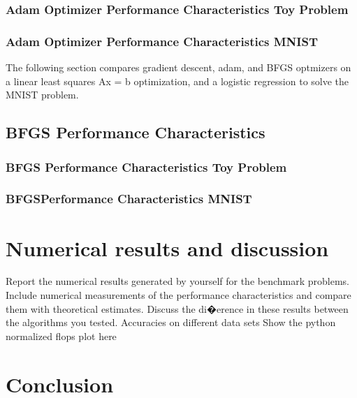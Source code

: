 \documentclass[10pt,twocolumn]{article}
\begin{document}
\subsubsection{Adam Optimizer Performance Characteristics Toy Problem}
\subsubsection{Adam Optimizer Performance Characteristics MNIST}
The following section compares gradient descent, adam, and BFGS optmizers on a linear least squares Ax = b optimization, and a logistic regression to solve the MNIST problem.


\subsection{BFGS Performance Characteristics}
\subsubsection{BFGS Performance Characteristics Toy Problem}
\subsubsection{BFGSPerformance Characteristics MNIST}

\section{Numerical results and discussion}
Report the numerical results generated by yourself for the benchmark problems. Include numerical measurements of the performance characteristics and compare them with theoretical estimates. Discuss the di�erence in these results between the algorithms you tested.
Accuracies on different data sets
Show the python normalized flops plot here
\section{Conclusion}







\end{document}
